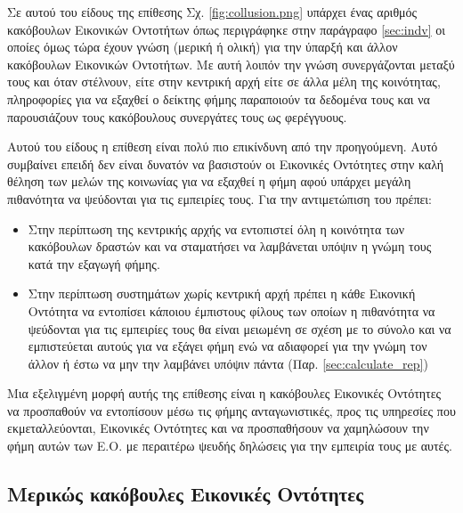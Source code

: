 Σε αυτού του είδους της επίθεσης Σχ. \ref{fig:collusion.png} υπάρχει ένας αριθμός κακόβουλων Εικονικών Οντοτήτων όπως περιγράφηκε στην παράγραφο \ref{sec:indv} οι οποίες όμως τώρα έχουν γνώση (μερική ή ολική) για την ύπαρξή και άλλον κακόβουλων Εικονικών Οντοτήτων. Με αυτή λοιπόν την γνώση συνεργάζονται μεταξύ τους και όταν στέλνουν, είτε στην κεντρική αρχή είτε σε άλλα μέλη της κοινότητας, πληροφορίες για να εξαχθεί ο δείκτης φήμης παραποιούν τα δεδομένα τους και να παρουσιάζουν τους κακόβουλους συνεργάτες τους ως φερέγγυους.


Αυτού του είδους η επίθεση είναι πολύ πιο επικίνδυνη από την προηγούμενη. Αυτό συμβαίνει επειδή δεν είναι δυνατόν να βασιστούν οι Εικονικές Οντότητες στην καλή θέληση των μελών της κοινωνίας για να εξαχθεί η φήμη αφού υπάρχει μεγάλη πιθανότητα να ψεύδονται για τις εμπειρίες τους. Για την αντιμετώπιση του πρέπει: \begin{itemize}
\item Στην περίπτωση της κεντρικής αρχής να εντοπιστεί όλη η κοινότητα των κακόβουλων δραστών και να σταματήσει να λαμβάνεται υπόψιν η γνώμη τους κατά την εξαγωγή φήμης.

\item Στην περίπτωση συστημάτων χωρίς κεντρική αρχή πρέπει η κάθε Εικονική Οντότητα να εντοπίσει κάποιου έμπιστους φίλους των οποίων η πιθανότητα να ψεύδονται για τις εμπειρίες τους θα είναι μειωμένη σε σχέση με το σύνολο και να εμπιστεύεται αυτούς για να εξάγει φήμη ενώ να αδιαφορεί για την γνώμη τον άλλον ή έστω να μην την λαμβάνει υπόψιν πάντα  (Παρ. \ref{sec:calculate_rep})
\end{itemize}

Μια εξελιγμένη μορφή αυτής της επίθεσης είναι η κακόβουλες Εικονικές Οντότητες να προσπαθούν να εντοπίσουν μέσω τις φήμης ανταγωνιστικές, προς τις υπηρεσίες που εκμεταλλεύονται, Εικονικές Οντότητες και να προσπαθήσουν να χαμηλώσουν την φήμη αυτών των Ε.Ο. με περαιτέρω ψευδής δηλώσεις για την εμπειρία τους με αυτές.

\subsection{Μερικώς κακόβουλες Εικονικές Οντότητες}\label{sec:part}

